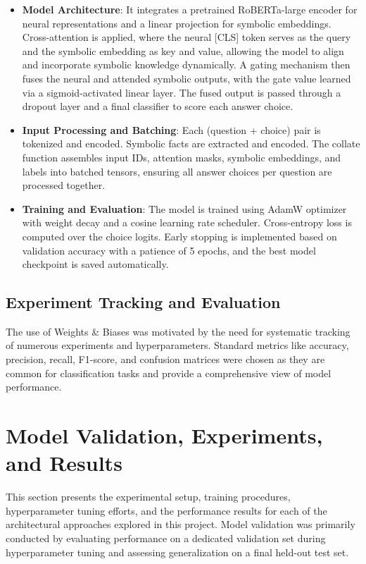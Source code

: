 \documentclass[10.5pt]{article}
\begin{document}
\begin{itemize}
    \item \textbf{Model Architecture}: It integrates a pretrained RoBERTa-large encoder for neural representations and a linear projection for symbolic embeddings. Cross-attention is applied, where the neural [CLS] token serves as the query and the symbolic embedding as key and value, allowing the model to align and incorporate symbolic knowledge dynamically. A gating mechanism then fuses the neural and attended symbolic outputs, with the gate value learned via a sigmoid-activated linear layer. The fused output is passed through a dropout layer and a final classifier to score each answer choice.
    
    \item \textbf{Input Processing and Batching}: Each (question + choice) pair is tokenized and encoded. Symbolic facts are extracted and encoded. The collate function assembles input IDs, attention masks, symbolic embeddings, and labels into batched tensors, ensuring all answer choices per question are processed together.
    
    \item \textbf{Training and Evaluation}: The model is trained using AdamW optimizer with weight decay and a cosine learning rate scheduler. Cross-entropy loss is computed over the choice logits. Early stopping is implemented based on validation accuracy with a patience of 5 epochs, and the best model checkpoint is saved automatically.

\end{itemize}


\subsection{Experiment Tracking and Evaluation}
The use of Weights \& Biases was motivated by the need for systematic tracking of numerous experiments and hyperparameters. Standard metrics like accuracy, precision, recall, F1-score, and confusion matrices were chosen as they are common for classification tasks and provide a comprehensive view of model performance.

\newpage
\section{Model Validation, Experiments, and Results}
This section presents the experimental setup, training procedures, hyperparameter tuning efforts, and the performance results for each of the architectural approaches explored in this project. Model validation was primarily conducted by evaluating performance on a dedicated validation set during hyperparameter tuning and assessing generalization on a final held-out test set.
\end{document}
